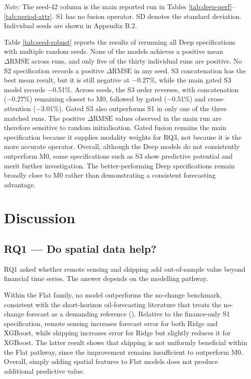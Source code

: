 \documentclass[
  british,
  12pt,
  oneside]{book}
\begin{document}
\emph{Note:} The seed-42 column is the main reported run in Tables \ref{tab:deep-perf}--\ref{tab:period-attr}. S1 has no fusion operator. SD denotes the standard deviation. Individual seeds are shown in Appendix B.2.

Table \ref{tab:seed-robust} reports the results of rerunning all Deep specifications with multiple random seeds. None of the models achieves a positive mean \(\Delta\mathrm{RMSE}\) across runs, and only five of the thirty individual runs are positive. No S2 specification records a positive \(\Delta\mathrm{RMSE}\) in any seed. S3 concatenation has the best mean result, but it is still negative at −0.27\%, while the main gated S3 model records −0.51\%. Across seeds, the S3 order reverses, with concatenation (−0.27\%) remaining closest to M0, followed by gated (−0.51\%) and cross-attention (−3.01\%). Gated S3 also outperforms S1 in only one of the three matched runs. The positive \(\Delta\mathrm{RMSE}\) values observed in the main run are therefore sensitive to random initialisation. Gated fusion remains the main specification because it supplies modality weights for RQ3, not because it is the more accurate operator. Overall, although the Deep models do not consistently outperform M0, some specifications such as S3 show predictive potential and merit further investigation. The better-performing Deep specifications remain broadly close to M0 rather than demonstrating a consistent forecasting advantage.

\chapter{Discussion}\label{discussion}

\section{RQ1 --- Do spatial data help?}\label{discussion-rq1}

RQ1 asked whether remote sensing and shipping add out-of-sample value beyond financial time series. The answer depends on the modelling pathway.

Within the Flat family, no model outperforms the no-change benchmark, consistent with the short-horizon oil-forecasting literature that treats the no-change forecast as a demanding reference (). Relative to the finance-only S1 specification, remote sensing increases forecast error for both Ridge and XGBoost, while shipping increases error for Ridge but slightly reduces it for XGBoost. The latter result shows that shipping is not uniformly beneficial within the Flat pathway, since the improvement remains insufficient to outperform M0. Overall, simply adding spatial features to Flat models does not produce additional predictive value.
\end{document}
